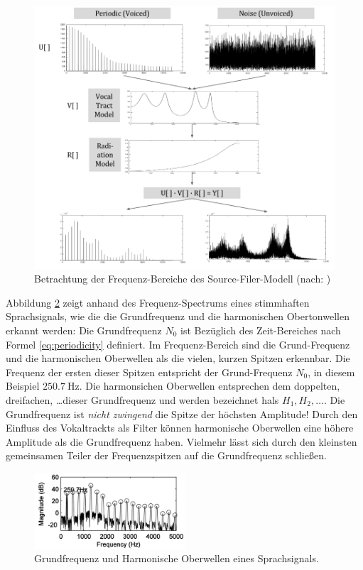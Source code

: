 \begin{figure}[h]
	\centering
	\includegraphics[width=1\textwidth]{bilder/sourceFilterSpectra.png}
	\caption{Betrachtung der Frequenz-Bereiche des Source-Filer-Modell (nach: \cite[Source Estimation, S. 3]{ricardo_ceps})}
	\label{img:sourceFilerSpectra}
\end{figure}	

Abbildung \ref{img:pitchPeaks} zeigt anhand des Frequenz-Spectrums eines stimmhaften Sprachsignals, wie die die Grundfrequenz und die harmonischen Obertonwellen erkannt werden: Die Grundfrequenz $N_0$ ist Bezüglich des Zeit-Bereiches nach Formel \ref{eq:periodicity} definiert. Im Frequenz-Bereich sind die Grund-Frequenz und die harmonischen Oberwellen als die \glqq vielen, kurzen Spitzen\grqq{} erkennbar. Die Frequenz der ersten dieser Spitzen entspricht der Grund-Frequenz $N_0$, in diesem Beispiel $\SI{250.7}{\hertz}$. Die harmonsichen Oberwellen entsprechen dem doppelten, dreifachen, \ldots dieser Grundfrequenz und werden bezeichnet hals $H_1, H_2, \ldots$. Die Grundfrequenz ist \emph{nicht zwingend} die Spitze der höchsten Amplitude! Durch den Einfluss des Vokaltrackts als Filter können harmonische Oberwellen eine höhere Amplitude als die Grundfrequenz haben. Vielmehr lässt sich durch den kleinsten gemeinsamen Teiler der Frequenzspitzen auf die Grundfrequenz schließen.\cite[S. 52 - 53]{sprachverarbeitung}

\begin{figure}[h]
	\centering
	\includegraphics[width=0.5\textwidth]{bilder/pitchPeaks.png}
	\caption{Grundfrequenz und Harmonische Oberwellen eines Sprachsignals.}
	\label{img:pitchPeaks}
\end{figure}	

